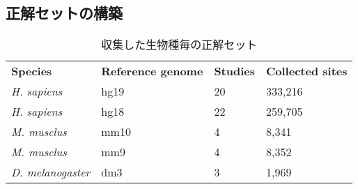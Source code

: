 \subsection{正解セットの構築}
\begin{table}[htbp]
	\begin{center}
		\begin{tabular}{llll}
			\bf{Species} & \bf{Reference genome} & \bf{Studies} & \bf{Collected sites} \\
			\it{H. sapiens} & hg19 & 20 & 333,216 \\
			\it{H. sapiens} & hg18 & 22 & 259,705 \\
			\it{M. musclus} & mm10 & 4 & 8,341 \\
			\it{M. musclus} & mm9 & 4 & 8,352 \\
			\it{D. melanogaster} & dm3 & 3 & 1,969
		\end{tabular}
		\label{tab:collection}
		\caption{収集した生物種毎の正解セット}
	\end{center}
\end{table}

